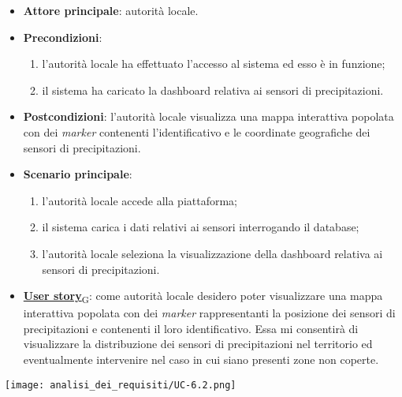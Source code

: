 \begin{itemize}
	\item \textbf{Attore principale}: autorità locale.
	\item \textbf{Precondizioni}:
	      \begin{enumerate}
		      \item l'autorità locale ha effettuato l'accesso al sistema ed esso è in funzione;
		      \item il sistema ha caricato la dashboard relativa ai sensori di precipitazioni.
	      \end{enumerate}
	\item \textbf{Postcondizioni}: l'autorità locale visualizza una mappa interattiva popolata con dei \textit{marker} contenenti l'identificativo e le coordinate geografiche dei sensori di precipitazioni.
	\item \textbf{Scenario principale}:
	      \begin{enumerate}
		      \item l'autorità locale accede alla piattaforma;
		      \item il sistema carica i dati relativi ai sensori interrogando il database;
		      \item l'autorità locale seleziona la visualizzazione della dashboard relativa ai sensori di precipitazioni.
	      \end{enumerate}
	\item \href{https://7last.github.io/docs/rtb/documentazione-interna/glossario\#user-story}{\textbf{User story}\textsubscript{G}}:
	      come autorità locale desidero poter visualizzare una mappa interattiva popolata con dei \textit{marker} rappresentanti la posizione dei sensori di precipitazioni
	      e contenenti il loro identificativo. Essa mi consentirà di visualizzare la distribuzione dei sensori di precipitazioni nel territorio ed
	      eventualmente intervenire nel caso in cui siano presenti zone non coperte.
\end{itemize}
\begin{center}
	\texttt{[image: analisi\_dei\_requisiti/UC-6.2.png]}
\end{center}


